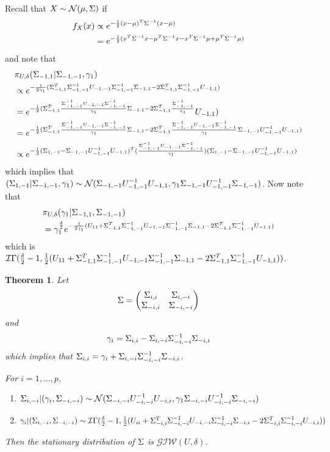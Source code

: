 \documentclass[12pt, leqno]{article}
\def\invgamma{\ensuremath \mathcal{I}\Gamma}
\def\s{\ensuremath\Sigma}
\newtheorem{thm}{Theorem}[]
\begin{document}
Recall that $X \sim \mathcal{N}(\mu,\s)$ if 
\begin{align*}
f_X(x) &\propto e^{-\frac{1}{2}(x-\mu)^T \s^{-1} (x-\mu)} \\
&=e^{-\frac{1}{2} (x^T \s^{-1} x-\mu^T \s^{-1} x -x^T \s^{-1} \mu +\mu^T \s^{-1} \mu)}
\end{align*}
and note that
\begin{align*} 
&\pi_{U,\delta}(\s_{-1,1}|\s_{-1,-1},\gamma_1) \\
&\propto e^{-
  \frac{1}{2\gamma_1}(\s_{-1,1}^T\s_{-1,-1}^{-1}U_{-1,-1}
  \s_{-1,-1}^{-1}\s_{-1,1}
  -2\s_{-1,1}^T\s_{-1,-1}^{-1}U_{-1,1})}\\ 
&=e^{-
  \frac{1}{2}(\s_{-1,1}^T\frac{\s_{-1,-1}^{-1}U_{-1,-1}
  \s_{-1,-1}^{-1}}{\gamma_1}\s_{-1,1}
  -2\s_{-1,1}^T\frac{\s_{-1,-1}^{-1}}{\gamma_1}}U_{-1,1})\\
&=e^{-
  \frac{1}{2}(\s_{-1,1}^T\frac{\s_{-1,-1}^{-1}U_{-1,-1}
  \s_{-1,-1}^{-1}}{\gamma_1}\s_{-1,1}
  -2\s_{-1,1}^T\frac{\s_{-1,-1}^{-1}U_{-1,-1}
  \s_{-1,-1}^{-1} }{\gamma_1} \s_{-1,-1}U_{-1,-1}^{-1} U_{-1,1})}\\ 
&\propto e^{-
  \frac{1}{2}(\s_{1,-1} -\s_{-1,-1}U_{-1,-1}^{-1} U_{-1,1})^T (\frac{\s_{-1,-1}^{-1}U_{-1,-1}
  \s_{-1,-1}^{-1}}{\gamma_1})(\s_{1,-1} -\s_{-1,-1}U_{-1,-1}^{-1} U_{-1,1})}\\ 
\end{align*}
which implies that $(\s_{1,-1}|\s_{-1,-1},\gamma_1) \sim \mathcal{N}(
\s_{-1,-1}U_{-1,-1}^{-1} U_{-1,1},{\gamma_1}{\s_{-1,-1}U_{-1,-1}^{-1}
  \s_{-1,-1}})$.
Now note that 
\begin{align*} 
&\pi_{U,\delta}(\gamma_1|\s_{-1,1},\s_{-1,-1}) \\
&= \gamma_1^{\frac{\delta}{2}} e^{-\frac{1}{2 \gamma_1}(U_{11} +\s_{-1,1}^T\s_{-1,-1}^{-1}U_{-1,-1}
  \s_{-1,-1}^{-1}\s_{-1,1}
  -2\s_{-1,1}^T\s_{-1,-1}^{-1}U_{-1,1})}
\end{align*}
which is $\invgamma (\frac{\delta}{2}-1, \frac{1}{2}(U_{11} +\s_{-1,1}^T\s_{-1,-1}^{-1}U_{-1,-1}
  \s_{-1,-1}^{-1}\s_{-1,1}
  -2\s_{-1,1}^T\s_{-1,-1}^{-1}U_{-1,1}))$.
\begin{thm}\label{covargibbs}
Let 
\[
\s = \begin{pmatrix} 
\s_{i,i} & \s_{i,-i}\\
\s_{-i,i} & \s_{-i,-i} 
\end{pmatrix}
\]
and 
\[
\gamma_i = \s_{i,i} - \s_{i,-i}\s_{-i,-i}^{-1}\s_{-i,i} 
\]
which implies that $\s_{i,i} = \gamma_i + \s_{i,-i}\s_{-i,-i}^{-1}\s_{-i,i}$.

For $i = 1,...,p$,
\begin{enumerate}
\item $\s_{i,-i}|(\gamma_i,\s_{-i,-i}) \sim \mathcal{N}(
\s_{-i,-i}U_{-i,-i}^{-1} U_{-i,i},{\gamma_1}{\s_{-i,-i}U_{-i,-i}^{-1}
  \s_{-i,-i}})$
\item $\gamma_i|(\s_{i,-i},\s_{-i,-i}) \sim \invgamma (\frac{\delta}{2}-1, \frac{1}{2}(U_{ii} +\s_{-i,i}^T\s_{-i,-i}^{-1}U_{-i,-i}
  \s_{-i,-i}^{-1}\s_{-i,i}
  -2\s_{-i,i}^T\s_{-i,-i}^{-1}U_{-i,i}))$
\end{enumerate}
Then the stationary distribution of $\s$ is $\mathcal{GIW} (U, \delta)$.
\end{thm}
\end{document}
